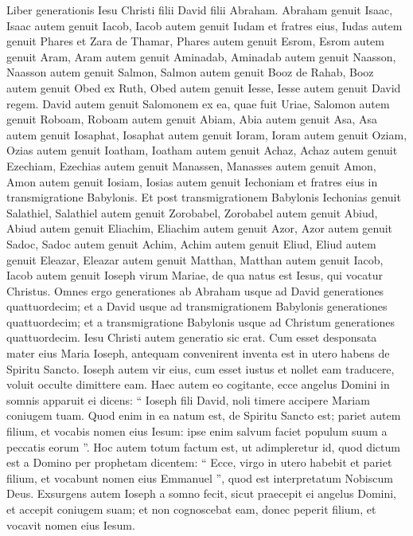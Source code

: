 \begin{biblechapter}
 \verse Liber generationis Iesu Christi filii David filii Abraham.
 \verse Abraham genuit Isaac, Isaac autem genuit Iacob, Iacob autem genuit Iudam et fratres eius, 
\verse Iudas autem genuit Phares et Zara de Thamar, Phares autem genuit Esrom, Esrom autem genuit Aram, 
\verse Aram autem genuit Aminadab, Aminadab autem genuit Naasson, Naasson autem genuit Salmon, 
\verse Salmon autem genuit Booz de Rahab, Booz autem genuit Obed ex Ruth, Obed autem genuit Iesse, 
 \verse Iesse autem genuit David regem.
 David autem genuit Salomonem ex ea, quae fuit Uriae, 
\verse Salomon autem genuit Roboam, Roboam autem genuit Abiam, Abia autem genuit Asa, 
\verse Asa autem genuit Iosaphat, Iosaphat autem genuit Ioram, Ioram autem genuit Oziam, 
\verse Ozias autem genuit Ioatham, Ioatham autem genuit Achaz, Achaz autem genuit Ezechiam, 
 \verse Ezechias autem genuit Manassen, Manasses autem genuit Amon, Amon autem genuit Iosiam, 
\verse Iosias autem genuit Iechoniam et fratres eius in transmigratione Babylonis.
 \verse Et post transmigrationem Babylonis Iechonias genuit Salathiel, Salathiel autem genuit Zorobabel, 
\verse Zorobabel autem genuit Abiud, Abiud autem genuit Eliachim, Eliachim autem genuit Azor, 
\verse Azor autem genuit Sadoc, Sadoc autem genuit Achim, Achim autem genuit Eliud, 
\verse Eliud autem genuit Eleazar, Eleazar autem genuit Matthan, Matthan autem genuit Iacob, 
\verse Iacob autem genuit Ioseph virum Mariae, de qua natus est Iesus, qui vocatur Christus.
 \verse Omnes ergo generationes ab Abraham usque ad David generationes quattuordecim; et a David usque ad transmigrationem Babylonis generationes quattuordecim; et a transmigratione Babylonis usque ad Christum generationes quattuordecim.
 \verse Iesu Christi autem generatio sic erat.
 Cum esset desponsata mater eius Maria Ioseph, antequam convenirent inventa est in utero habens de Spiritu Sancto.
 \verse Ioseph autem vir eius, cum esset iustus et nollet eam traducere, voluit occulte dimittere eam. 
\verse Haec autem eo cogitante, ecce angelus Domini in somnis apparuit ei dicens: “ Ioseph fili David, noli timere accipere Mariam coniugem tuam. Quod enim in ea natum est, de Spiritu Sancto est; 
\verse pariet autem filium, et vocabis nomen eius Iesum: ipse enim salvum faciet populum suum a peccatis eorum ”.
 \verse Hoc autem totum factum est, ut adimpleretur id, quod dictum est a Domino per prophetam dicentem: 
\verse “ Ecce, virgo in utero habebit et pariet filium, et vocabunt nomen eius Emmanuel ”, quod est interpretatum Nobiscum Deus.
 \verse Exsurgens autem Ioseph a somno fecit, sicut praecepit ei angelus Domini, et accepit coniugem suam; 
\verse et non cognoscebat eam, donec peperit filium, et vocavit nomen eius Iesum.
 

\end{biblechapter}
